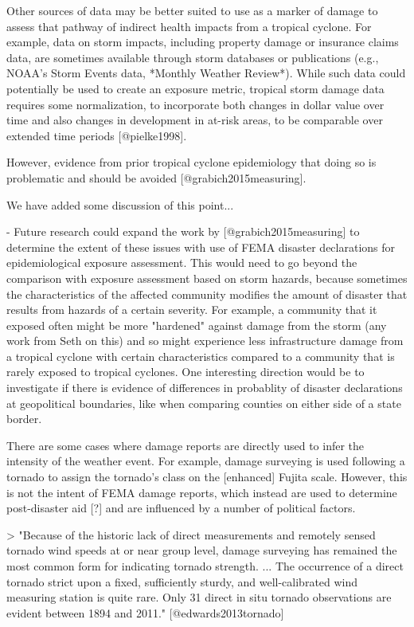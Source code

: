 Other sources of data may be better suited to use as a marker of damage to
assess that pathway of indirect health impacts from a tropical cyclone. For
example, data on storm impacts, including property damage or insurance claims
data, are sometimes available through storm databases or publications (e.g.,
NOAA's Storm Events data, *Monthly Weather Review*). While such data could
potentially be used to create an exposure metric, tropical storm damage data
requires some normalization, to incorporate both changes in dollar value over
time and also changes in development in at-risk areas, to be comparable over
extended time periods [@pielke1998].


However, evidence from prior tropical cyclone epidemiology that doing so is
problematic and should be avoided [@grabich2015measuring]. 

We have added some discussion of this point... 

- Future research could expand the work by [@grabich2015measuring] to determine
the extent of these issues with use of FEMA disaster declarations for
epidemiological exposure assessment. This would need to go beyond the comparison
with exposure assessment based on storm hazards, because sometimes the
characteristics of the affected community modifies the amount of disaster that
results from hazards of a certain severity. For example, a community that it
exposed often might be more "hardened" against damage from the storm (any work
from Seth on this) and so might experience less infrastructure damage from a
tropical cyclone with certain characteristics compared to a community that is
rarely exposed to tropical cyclones. One interesting direction would be to
investigate if there is evidence of differences in probablity of disaster
declarations at geopolitical boundaries, like when comparing counties on either
side of a state border.

There are some cases where damage reports are directly used to infer the
intensity of the weather event. For example, damage surveying is used following
a tornado to assign the tornado's class on the [enhanced] Fujita scale. However,
this is not the intent of FEMA damage reports, which instead are used to
determine post-disaster aid [?] and are influenced by a number of political
factors.

> "Because of the historic lack of direct measurements and remotely sensed
tornado wind speeds at or near group level, damage surveying has remained the
most common form for indicating tornado strength. ... The occurrence of a direct
tornado strict upon a fixed, sufficiently sturdy, and well-calibrated wind
measuring station is quite rare. Only 31 direct in situ tornado observations are
evident between 1894 and 2011." [@edwards2013tornado]

